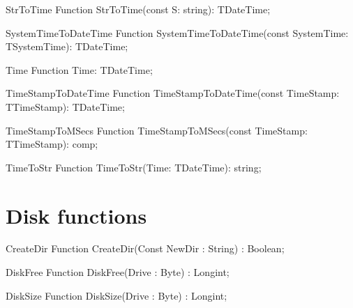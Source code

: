  
\begin{function}{StrToTime}
\Declaration
Function StrToTime(const S: string): TDateTime;
\Description
\Errors
\SeeAlso
\end{function}

 
\begin{function}{SystemTimeToDateTime}
\Declaration
Function SystemTimeToDateTime(const SystemTime: TSystemTime): TDateTime;
\Description
\Errors
\SeeAlso
\end{function}

 
\begin{function}{Time}
\Declaration
Function Time: TDateTime;
\Description
\Errors
\SeeAlso
\end{function}

 
\begin{function}{TimeStampToDateTime}
\Declaration
Function TimeStampToDateTime(const TimeStamp: TTimeStamp): TDateTime;
\Description
\Errors
\SeeAlso
\end{function}

 
\begin{function}{TimeStampToMSecs}
\Declaration
Function TimeStampToMSecs(const TimeStamp: TTimeStamp): comp;
\Description
\Errors
\SeeAlso
\end{function}

 
\begin{function}{TimeToStr}
\Declaration
Function TimeToStr(Time: TDateTime): string;
\Description
\Errors
\SeeAlso
\end{function}

 

\section{Disk functions}

\begin{function}{CreateDir}
\Declaration
Function CreateDir(Const NewDir : String) : Boolean;
\Description
\Errors
\SeeAlso
\end{function}

 
\begin{function}{DiskFree}
\Declaration
Function DiskFree(Drive : Byte) : Longint;
\Description
\Errors
\SeeAlso
\end{function}

 
\begin{function}{DiskSize}
\Declaration
Function DiskSize(Drive : Byte) : Longint;
\Description
\Errors
\SeeAlso
\end{function}

